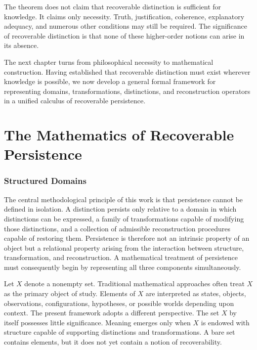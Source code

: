 \documentclass[12pt,oneside]{article}
\theoremstyle{definition}
\begin{document}
\begin{remark}

The theorem does not claim that recoverable distinction is sufficient for knowledge. It claims only necessity. Truth, justification, coherence, explanatory adequacy, and numerous other conditions may still be required. The significance of recoverable distinction is that none of these higher-order notions can arise in its absence.

\end{remark}

The next chapter turns from philosophical necessity to mathematical construction. Having established that recoverable distinction must exist wherever knowledge is possible, we now develop a general formal framework for representing domains, transformations, distinctions, and reconstruction operators in a unified calculus of recoverable persistence.

\part{The Mathematics of Recoverable Persistence}

\section{Structured Domains}

The central methodological principle of this work is that persistence cannot be defined in isolation. A distinction persists only relative to a domain in which distinctions can be expressed, a family of transformations capable of modifying those distinctions, and a collection of admissible reconstruction procedures capable of restoring them. Persistence is therefore not an intrinsic property of an object but a relational property arising from the interaction between structure, transformation, and reconstruction. A mathematical treatment of persistence must consequently begin by representing all three components simultaneously.

Let \(X\) denote a nonempty set. Traditional mathematical approaches often treat \(X\) as the primary object of study. Elements of \(X\) are interpreted as states, objects, observations, configurations, hypotheses, or possible worlds depending upon context. The present framework adopts a different perspective. The set \(X\) by itself possesses little significance. Meaning emerges only when \(X\) is endowed with structure capable of supporting distinctions and transformations. A bare set contains elements, but it does not yet contain a notion of recoverability.
\end{document}
